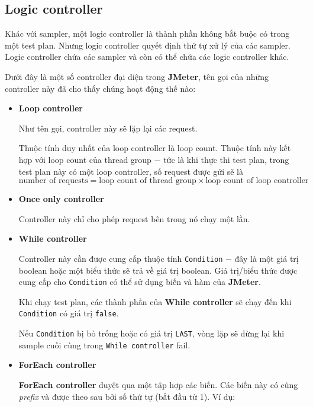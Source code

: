 \documentclass[10pt]{report}
\newcommand{\jmeter}{\textbf{JMeter}}
\begin{document}
\subsection{Logic controller}

\par Khác với sampler, một logic controller là thành phần không bắt buộc có trong một test plan. Nhưng logic controller quyết định thứ tự xử lý của các sampler. Logic controller chứa các sampler và còn có thể chứa các logic controller khác.

\par Dưới đây là một số controller đại diện trong \jmeter{}, tên gọi của những controller này đã cho thấy chúng hoạt động thế nào:

\begin{itemize}[itemsep=0pt]
    \item \textbf{Loop controller}
        \par Như tên gọi, controller này sẽ lặp lại các request.
        \par Thuộc tính duy nhất của loop controller là loop count. Thuộc tính này kết hợp với loop count của thread group $-$ tức là khi thực thi test plan, trong test plan này có một loop controller, số request được gửi sẽ là
        \[
            \text{number of requests} = \text{loop count of thread group} \times \text{loop count of loop controller}
        \]
    \item \textbf{Once only controller}
        \par Controller này chỉ cho phép request bên trong nó chạy một lần.
    \item \textbf{While controller}
        \par Controller này cần được cung cấp thuộc tính \texttt{Condition} $-$ đây là một giá trị boolean hoặc một biểu thức sẽ trả về giá trị boolean. Giá trị/biểu thức được cung cấp cho \texttt{Condition} có thể sử dụng biến và hàm của \jmeter{}.
        \par Khi chạy test plan, các thành phần của \textbf{While controller} sẽ chạy đến khi \texttt{Condition} có giá trị \texttt{false}.
        \par Nếu \texttt{Condition} bị bỏ trống hoặc có giá trị \texttt{LAST}, vòng lặp sẽ dừng lại khi sample cuối cùng trong \texttt{While controller} fail.
    \item \textbf{ForEach controller}
        \par \textbf{ForEach controller} duyệt qua một tập hợp các biến. Các biến này có cùng \textit{prefix} và được theo sau bởi số thứ tự (bắt đầu từ 1). Ví dụ:

\end{itemize}
\end{document}
